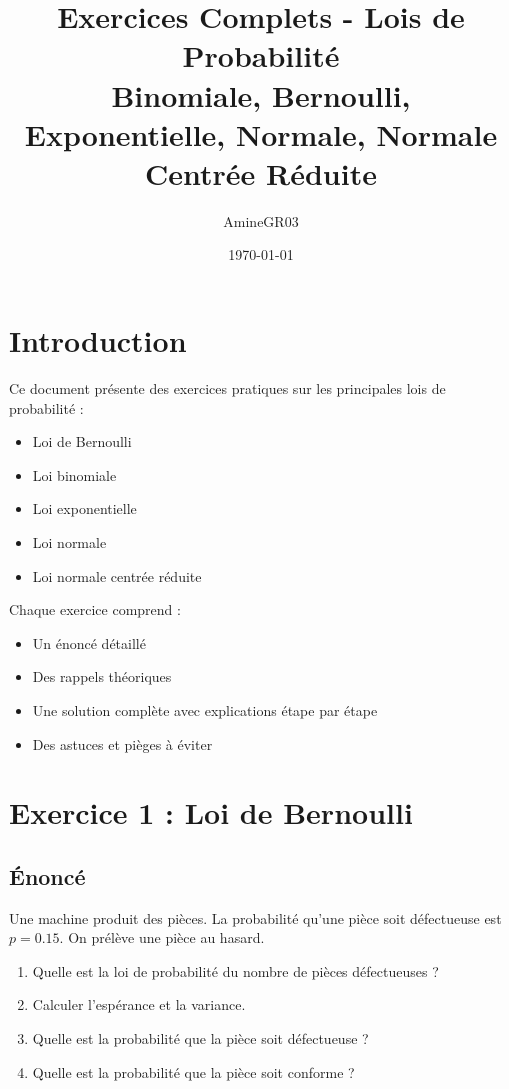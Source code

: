 \documentclass[11pt,a4paper]{article}
\title{Exercices Complets - Lois de Probabilité\\
\large Binomiale, Bernoulli, Exponentielle, Normale, Normale Centrée Réduite}
\author{AmineGR03}
\date{\today}
\begin{document}
\maketitle

\tableofcontents
\newpage

\section{Introduction}

Ce document présente des exercices pratiques sur les principales lois de probabilité :
\begin{itemize}
    \item Loi de Bernoulli
    \item Loi binomiale
    \item Loi exponentielle
    \item Loi normale
    \item Loi normale centrée réduite
\end{itemize}

Chaque exercice comprend :
\begin{itemize}
    \item Un énoncé détaillé
    \item Des rappels théoriques
    \item Une solution complète avec explications étape par étape
    \item Des astuces et pièges à éviter
\end{itemize}

\newpage

\section{Exercice 1 : Loi de Bernoulli}

\subsection{Énoncé}

Une machine produit des pièces. La probabilité qu'une pièce soit défectueuse est $p = 0.15$. On prélève une pièce au hasard.

\begin{enumerate}
    \item Quelle est la loi de probabilité du nombre de pièces défectueuses ?
    \item Calculer l'espérance et la variance.
    \item Quelle est la probabilité que la pièce soit défectueuse ?
    \item Quelle est la probabilité que la pièce soit conforme ?
\end{enumerate}
\end{document}
